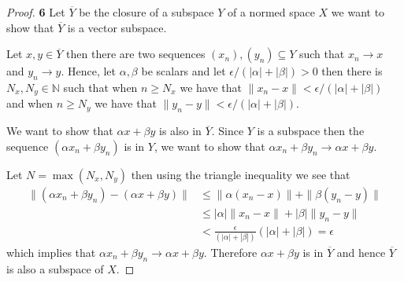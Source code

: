 \documentclass[11pt]{article}
\newcommand{\N}{\mathbb{N}}
\theoremstyle{definition}
\begin{document}
\begin{proof}{\textbf{6}}
    Let $\overline{Y}$ be the closure of a subspace $Y$ of a normed space $X$
    we want to show that $\overline{Y}$ is a vector subspace.

    Let $x,y \in \overline{Y}$ then there are two sequences
    $(x_n), (y_n) \subseteq Y$ such that $x_n \to x$ and $y_n \to y$.
    Hence, let $\alpha, \beta$ be scalars and let
    $\epsilon/(|\alpha| + |\beta|) > 0$ then there is
    $N_x,N_y \in \N$ such that when $n \geq N_x$ we have that
    $\|x_n - x\| < \epsilon/(|\alpha| + |\beta|)$
    and when $n \geq N_y$ we have that
    $\|y_n - y\| < \epsilon/(|\alpha| + |\beta|)$.

    We want to show that $\alpha x + \beta y$ is also in $\overline{Y}$.
    Since $Y$ is a subspace then the sequence $(\alpha x_n + \beta y_n)$ is in
    $Y$, we want to show that $\alpha x_n + \beta y_n \to \alpha x + \beta y$.

    Let $N = \max(N_x, N_y)$ then using the triangle inequality we see that
    \begin{align*}
        \|(\alpha x_n + \beta y_n) - (\alpha x + \beta y)\|
        &\leq \|\alpha (x_n - x)\| + \|\beta(y_n - y)\|\\
        &\leq |\alpha| \|x_n - x\| + |\beta|\|y_n - y\|\\
        &< \frac{\epsilon}{(|\alpha| + |\beta|)}(|\alpha| + |\beta|) = \epsilon
    \end{align*}
    which implies that $\alpha x_n + \beta y_n \to \alpha x + \beta y$.
    Therefore $\alpha x + \beta y$ is in $\overline{Y}$ and hence $\overline{Y}$
    is also a subspace of $X$.
\end{proof}
\end{document}

